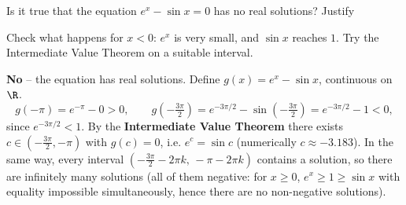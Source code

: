 
\begin{question}
Is it true that the equation $e^x-\sin x=0$ has no real solutions? Justify
\end{question}

\begin{hint}
Check what happens for $x<0$: $e^x$ is very small, and $\sin x$ reaches $1$. Try the Intermediate Value Theorem on a suitable interval.
\end{hint}

\begin{solution}
\textbf{No} -- the equation has real solutions. Define $g(x)=e^x-\sin x$, continuous on $\R$.
\[ g(-\pi)=e^{-\pi}-0>0,\qquad g\left(-\tfrac{3\pi}{2}\right)=e^{-3\pi/2}-\sin\left(-\tfrac{3\pi}{2}\right)=e^{-3\pi/2}-1<0, \]
since $e^{-3\pi/2}<1$. By the \textbf{Intermediate Value Theorem} there exists $c\in\left(-\frac{3\pi}2,-\pi\right)$ with $g(c)=0$, i.e. $e^c=\sin c$ (numerically $c\approx-3.183$). In the same way, every interval $\left(-\frac{3\pi}{2}-2\pi k,\,-\pi-2\pi k\right)$ contains a solution, so there are infinitely many solutions (all of them negative: for $x\ge0$, $e^x\ge1\ge\sin x$ with equality impossible simultaneously, hence there are no non-negative solutions).
\end{solution}
